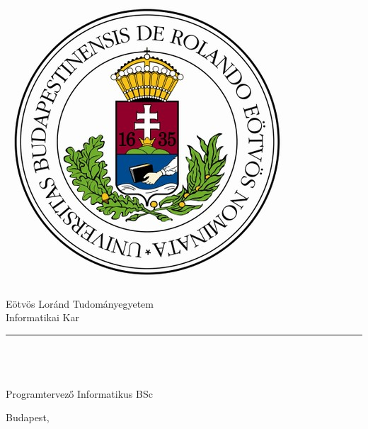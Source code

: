 \begin{titlepage}

\begin{minipage}{0.40\linewidth}
\includegraphics[scale=0.3]{img/elte-cimer}
\end{minipage}
\begin{minipage}{0.50\linewidth}
\begin{center}
Eötvös Loránd Tudományegyetem \\
Informatikai Kar \\
\DEPARTMENT
\end{center}
\end{minipage}

\hrule
\vfill

\begin{center}
\Huge
\textbf{\THESISTITLE}
\normalsize
\end{center}

\vfill

\begin{flushleft}
\textbf{\SUPERVISOR} \\
\SUPERVISORPOSITION \\

\textbf{\THESISAUTHOR} \\
Programtervező Informatikus BSc
\end{flushleft}

\vfill

\begin{center}
Budapest, \THESISDEFENCEYEAR
\end{center}

\end{titlepage}
